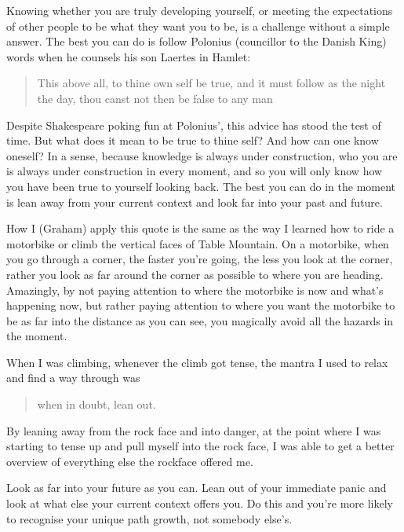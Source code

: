 Knowing whether you are truly developing yourself, or meeting the expectations of other people to be what they want you to be, is a challenge without a simple answer. The best you can do is follow Polonius  (councillor to the Danish King) words when he counsels his son Laertes in Hamlet\cite{shakespeare-own-self}: \begin{quote}This above all, to thine own self be true, and it must follow as the night the day, thou canst not then be false to any man\end{quote} 


Despite Shakespeare poking fun at Polonius’, this advice has stood the test of time. But what does it mean to be true to thine self? And how can one know oneself? In a sense, because knowledge is always under construction, who you are is always under construction in every moment, and so you will only know how you have been true to yourself looking back. The best you can do in the moment is lean away from your current context and look far into your past and future.


\begin{longstoryblock}
How I (Graham) apply this quote is the same as the way I learned how to ride a motorbike or climb the vertical faces of Table Mountain. On a motorbike, when you go through a corner, the faster you’re going, the less you look at the corner, rather you look as far around the corner as possible to where you are heading. Amazingly, by not paying attention to where the motorbike is now and what's happening now, but rather paying attention to where you want the motorbike to be as far into the distance as you can see, you magically avoid all the hazards in the moment.


When I was climbing, whenever the climb got tense, the mantra I used to relax and find a way through was \begin{quote} when in doubt, lean out. \end{quote} By leaning away from the rock face and into danger, at the point where I was starting to tense up and pull myself into the rock face, I was able to get a better overview of everything else the rockface offered me.
\end{longstoryblock}


Look as far into your future as you can. Lean out of your immediate panic and look at what else your current context offers you. Do this and you're more likely to recognise your unique path growth, not somebody else's.


